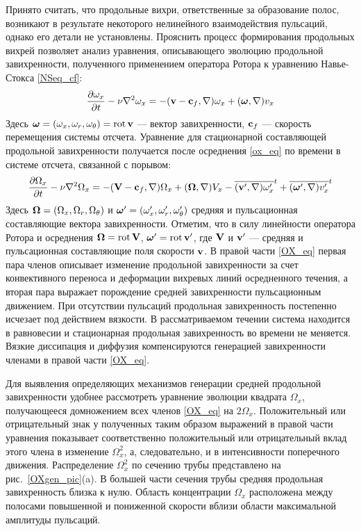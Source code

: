 Принято считать, что продольные вихри, ответственные за образование полос, возникают в результате некоторого нелинейного взаимодействия пульсаций, однако его детали не установлены. Прояснить процесс формирования продольных вихрей позволяет анализ уравнения, описывающего эволюцию продольной завихренности, полученного применением оператора Ротора к уравнению Навье-Стокса \eqref{NSeq_cf}:
\begin{equation}\label{ox_eq}
\frac{\partial \omega_x}{\partial t} - \nu\nabla^2 \omega_x =  -  (\mathbf{v} - \mathbf{c}_f, \nabla) \omega_x + (\mbox{\boldmath$\omega$}, \nabla) v_x
\end{equation}
Здесь $\mbox{\boldmath$\omega$} = (\omega_x, \omega_r, \omega_\theta) = \operatorname{rot} \mathbf{v}$ --- вектор завихренности, $\mathbf{c}_f$ --- скорость перемещения системы отсчета. Уравнение для стационарной составляющей продольной завихренности получается после осреднения \eqref{ox_eq} по времени в системе отсчета, связанной с порывом:
\begin{equation}\label{OX_eq}
\frac{\partial \Omega_x}{\partial t} - \nu\nabla^2 \Omega_x = - (\mathbf{V} - \mathbf{c}_f, \nabla) \Omega_x + (\mbox{\boldmath$\Omega$}, \nabla) V_x - \overline{(\mathbf{v}', \nabla) \omega'_x}^t + \overline{ (\mbox{\boldmath$\omega$}', \nabla) v'_x }^t
\end{equation}
Здесь  $\mbox{\boldmath$\Omega$}=(\Omega_x, \Omega_r, \Omega_\theta)$ и $\mbox{\boldmath$\omega$}'=(\omega'_x, \omega'_r, \omega'_\theta)$ средняя и пульсационная составляющие вектора завихренности. Отметим, что в силу линейности оператора Ротора и осреднения $\mbox{\boldmath$\Omega$} = \operatorname{rot} \mathbf{V}$, $\mbox{\boldmath$\omega$}' = \operatorname{rot} \mathbf{v}'$, где $\mathbf{V}$ и $\mathbf{v}'$ --- средняя и пульсационная составляющие поля скорости $\mathbf{v}$. В правой части \eqref{OX_eq} первая пара членов описывает изменение продольной завихренности за счет конвективного переноса и деформации вихревых линий осредненного течения, а вторая пара выражает порождение средней завихренности пульсационным движением. При отсутствии пульсаций продольная завихренность постепенно исчезает под действием вязкости. В рассматриваемом течении система находится в равновесии и стационарная продольная завихренность во времени не меняется. Вязкие диссипация и диффузия компенсируются генерацией завихренности членами в правой части \eqref{OX_eq}.

Для выявления определяющих механизмов генерации средней продольной завихренности удобнее рассмотреть уравнение эволюции квадрата $\Omega_x$, получающееся домножением всех членов \eqref{OX_eq} на $2\Omega_x$. Положительный или отрицательный знак у полученных таким образом выражений в правой части уравнения показывает соответственно положительный или отрицательный вклад этого члена в изменение $\Omega_x^2$, а, следовательно, и в интенсивности поперечного движения. Распределение $\Omega_x^2$ по сечению трубы представлено на рис.~\ref{OXgen_pic}(a). В большей части сечения трубы средняя продольная завихренность близка к нулю. Область концентрации $\Omega_x$ расположена между полосами повышенной и пониженной скорости вблизи области максимальной амплитуды пульсаций.

